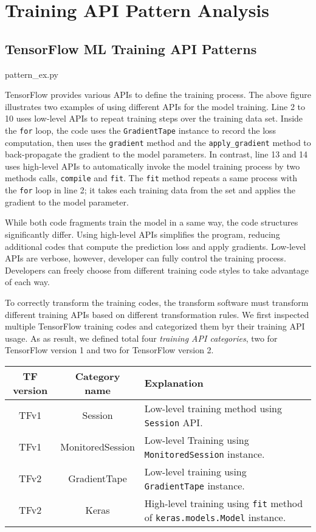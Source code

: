 \section{Training API Pattern Analysis}\label{sec:pattern}

\subsection{TensorFlow ML Training API Patterns}


{pattern_ex.py}

TensorFlow provides various APIs to define the training process.
The above figure illustrates two examples of using 
different APIs for the model training.
Line 2 to 10 uses low-level APIs to repeat training steps over the training
data set. Inside the {\tt for} loop, 
the code uses the {\tt GradientTape} instance to record the loss computation,
then uses the {\tt gradient} method and the {\tt apply\_gradient} method to
back-propagate the gradient to the model parameters.
In contrast, line 13 and 14 uses high-level APIs to automatically
invoke the model training process by two methods calls, {\tt compile} and
{\tt fit}. The {\tt fit} method repeats a same process with the {\tt for}
loop in line 2; it takes each training data from the set and
applies the gradient to the model parameter.

While both code fragments train the model in a same way, 
the code structures significantly differ.
Using high-level APIs simplifies the program,
reducing additional codes that compute the prediction loss and apply gradients.
Low-level APIs are verbose, however, developer can fully control
the training process.
Developers can freely choose from different training code styles to
take advantage of each way.

To correctly transform the training codes,
the transform software must transform different training APIs
based on different transformation rules. 
We first inspected multiple TensorFlow training codes and categorized them
byr their training API usage. 
As as result, we defined total four \textit{training API categories},
two for TensorFlow version 1 and two for TensorFlow version 2.

\begin{center}
  \begin{tabular}{|c|c|l|}
  \hline
  TF version & Category name & Explanation \\ 
  \hline
  TFv1 & Session & Low-level training method using {\tt Session} API. \\
  \hline
  TFv1 & MonitoredSession & Low-level Training using {\tt MonitoredSession} instance. \\
  \hline
  TFv2 & GradientTape & Low-level training using {\tt GradientTape} instance. \\
  \hline
  TFv2 & Keras & High-level training using {\tt fit} method of {\tt keras.models.Model} instance. \\
  \hline
\end{tabular}
\end{center}

